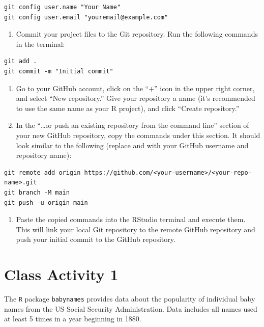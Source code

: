 \documentclass[
]{book}
\providecommand{\tightlist}{%
  \setlength{\itemsep}{0pt}\setlength{\parskip}{0pt}}
\begin{document}
\begin{verbatim}
git config user.name "Your Name"
git config user.email "youremail@example.com"
\end{verbatim}

\begin{enumerate}
\def\labelenumi{\arabic{enumi}.}
\setcounter{enumi}{3}
\tightlist
\item
  Commit your project files to the Git repository. Run the following commands in the terminal:
\end{enumerate}

\begin{verbatim}
git add .
git commit -m "Initial commit"
\end{verbatim}

\begin{enumerate}
\def\labelenumi{\arabic{enumi}.}
\setcounter{enumi}{4}
\item
  Go to your GitHub account, click on the ``+'' icon in the upper right corner, and select ``New repository.'' Give your repository a name (it's recommended to use the same name as your R project), and click ``Create repository.''
\item
  In the ``\ldots or push an existing repository from the command line'' section of your new GitHub repository, copy the commands under this section. It should look similar to the following (replace and with your GitHub username and repository name):
\end{enumerate}

\begin{verbatim}
git remote add origin https://github.com/<your-username>/<your-repo-name>.git
git branch -M main
git push -u origin main
\end{verbatim}

\begin{enumerate}
\def\labelenumi{\arabic{enumi}.}
\setcounter{enumi}{6}
\tightlist
\item
  Paste the copied commands into the RStudio terminal and execute them. This will link your local Git repository to the remote GitHub repository and push your initial commit to the GitHub repository.
\end{enumerate}

\hypertarget{class-activity-1}{%
\chapter{Class Activity 1}\label{class-activity-1}}

The \texttt{R} package \texttt{babynames} provides data about the popularity of individual baby names from the US Social Security Administration. Data includes all names used at least 5 times in a year beginning in 1880.
\end{document}

